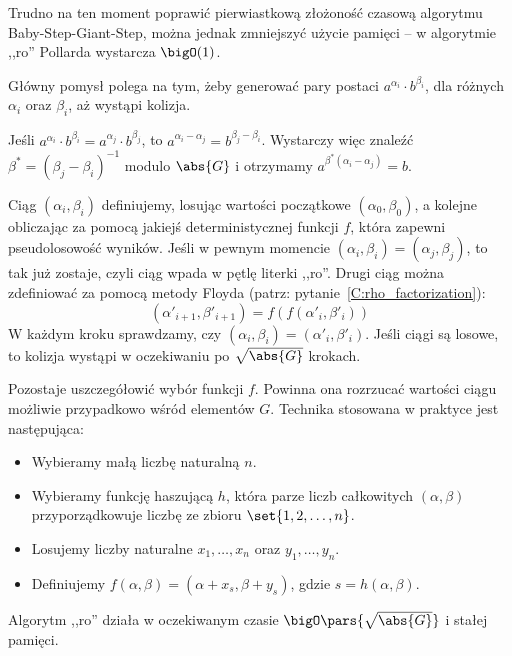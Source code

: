Trudno na ten moment poprawić pierwiastkową złożoność czasową algorytmu Baby-Step-Giant-Step, można jednak zmniejszyć użycie pamięci -- w algorytmie ,,ro'' Pollarda wystarcza \( \bigO(1) \).

Główny pomysł polega na tym, żeby generować pary postaci \( a^{\alpha_i} \cdot b^{\beta_i} \), dla różnych \( \alpha_i \) oraz \( \beta_i \), aż wystąpi kolizja.

Jeśli \( a^{\alpha_i} \cdot b^{\beta_i} = a^{\alpha_j} \cdot b^{\beta_j} \), to \( a^{\alpha_i - \alpha_j} = b^{\beta_j - \beta_i} \). Wystarczy więc znaleźć \( \beta^{*} = (\beta_j - \beta_i)^{-1} \) modulo \( \abs{G} \) i otrzymamy \( a^{\beta^{*} (\alpha_i - \alpha_j)} = b \).

Ciąg \( (\alpha_i, \beta_i) \) definiujemy, losując wartości początkowe \( (\alpha_0, \beta_0) \), a kolejne obliczając za pomocą jakiejś deterministycznej funkcji \( f \), która zapewni pseudolosowość wyników.
Jeśli w pewnym momencie \( (\alpha_i, \beta_i) = (\alpha_j, \beta_j) \), to tak już zostaje, czyli ciąg wpada w pętlę literki ,,ro''. Drugi ciąg można zdefiniować za pomocą metody Floyda (patrz: pytanie~\ref{C:rho_factorization}):
\[ (\alpha'_{i+1}, \beta'_{i+1}) = f(f(\alpha'_i, \beta'_i)) \]
W każdym kroku sprawdzamy, czy \( (\alpha_i, \beta_i) = (\alpha'_i, \beta'_i) \). Jeśli ciągi są losowe, to kolizja wystąpi w oczekiwaniu po \( \sqrt{\abs{G}} \) krokach.

Pozostaje uszczegółowić wybór funkcji \( f \). Powinna ona rozrzucać wartości ciągu możliwie przypadkowo wśród elementów \( G \). Technika stosowana w praktyce jest następująca:
\begin{itemize}
    \onehalfspacing
    \item Wybieramy małą liczbę naturalną \( n \).
    \item Wybieramy funkcję haszującą \( h \), która parze liczb całkowitych \( (\alpha, \beta) \) przyporządkowuje liczbę ze zbioru \( \set{1, 2, \dots, n} \).
    \item Losujemy liczby naturalne \( x_1, \dots, x_n \) oraz \( y_1, \dots, y_n \).
    \item Definiujemy \( f(\alpha, \beta) = (\alpha + x_s, \beta + y_s) \), gdzie \( s = h(\alpha, \beta) \).
\end{itemize}

Algorytm ,,ro'' działa w oczekiwanym czasie \( \bigO\pars{\sqrt{\abs{G}}} \) i stałej pamięci.